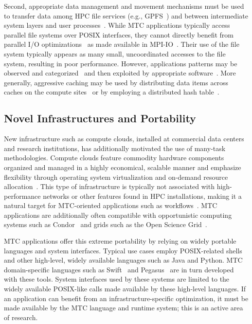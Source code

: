 \documentclass[10pt,letterpaper]{article}
\begin{document}
Second, appropriate data management and movement mechanisms must be
used to transfer data among HPC file services (e.g.,
GPFS~\cite{GPFS_2002}) and between intermediate system layers and user
processes~\cite{Collective_IO_2008}.  While MTC applications typically
access parallel file systems over POSIX interfaces, they cannot
directly benefit from parallel I/O
optimizations~\cite{ParallelIO_2008} as made available in
MPI-IO~\cite{MPI-IO_1999}.  Their use of the file system
typically appears as many small,
uncoordinated accesses to the file system, resulting in poor
performance.  However, applications patterns may be
observed and categorized~\cite{wozniak09petascalestorage} and then exploited by appropriate
software~\cite{Collective_IO_2008}.
More generally, aggressive caching may be used by
distributing data items across caches on the compute
sites~\cite{DataDiffusion_2008} or by employing a distributed
hash table~\cite{CMPI_2010}.

\subsection{Novel Infrastructures and Portability}

New infrastructure such as compute clouds, installed at commercial
data centers and research institutions, has additionally motivated
the use of many-task methodologies.  Compute clouds feature commodity
hardware components organized and managed in a highly economical,
scalable manner and emphasize flexibility through operating system
virtualization and on-demand resource
allocation~\cite{CloudOverview_2008}.  This type of infrastructure is
typically not associated with high-performance networks or other
features found in HPC installations, making it a natural target for
MTC-oriented applications such as
workflows~\cite{CloudWorkflows_2008}.  MTC applications are
additionally often compatible with opportunistic computing systems
such as Condor~\cite{Condor_Experience_2004} and grids such as the
Open Science Grid~\cite{OSG_2007}.

MTC applications offer this extreme portability by relying on widely
portable languages and system interfaces.  Typical use cases employ
POSIX-related shells and other high-level, widely available languages
such as Java and Python.  MTC domain-specific languages such as Swift~\cite{swift-ieee09,Swift_2011}
and Pegasus~\cite{Pegasus_2005} are in turn developed with these tools.  System interfaces
used by these systems are limited to the widely available POSIX-like
calls made available by these high-level languages.  If an application
can benefit from an infrastructure-specific
optimization, it must be made available by the MTC language and
runtime system; this is an active area of research.
\end{document}
